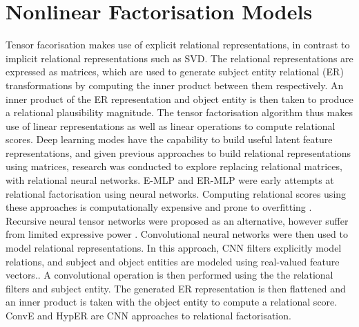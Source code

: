 \section{Nonlinear Factorisation Models}
Tensor facorisation makes use of explicit relational representations, in contrast to implicit relational representations such as SVD. The relational representations are expressed as matrices, which are used to generate subject entity relational (ER) transformations by computing the inner product between them respectively. An inner product of the ER representation and object entity is then taken to produce a relational plausibility magnitude. The tensor factorisation algorithm thus makes use of linear representations as well as linear operations to compute relational scores. 
Deep learning modes have the capability to build useful latent feature representations, and given previous approaches to build relational representations using matrices, research was conducted to explore replacing relational matrices, with relational neural networks. E-MLP and ER-MLP were early attempts at relational factorisation using neural networks. Computing relational scores using these approaches is computationally expensive and prone to overfitting \cite{reference}. Recursive neural tensor networks were proposed as an alternative, however suffer from limited expressive power \cite{reference}.
Convolutional neural networks were then used to model relational representations. In this approach, CNN filters explicitly model relations, and subject and object entities are modeled using real-valued feature vectors.. A convolutional operation is then performed using the the relational filters and subject entity. The generated ER representation is then flattened and an inner product is taken with the object entity to compute a relational score. ConvE and HypER are CNN approaches to relational factorisation. 


